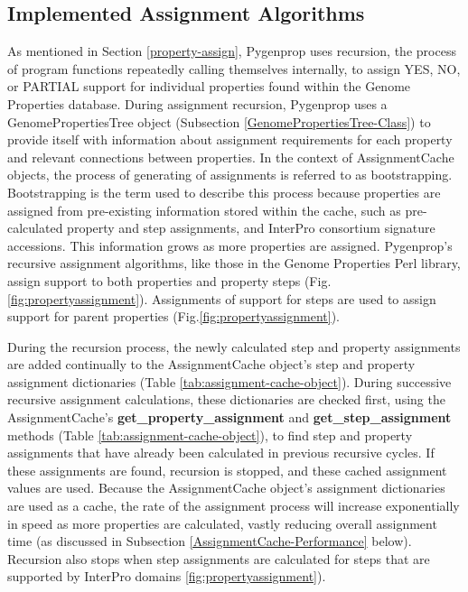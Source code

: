 \subsection{Implemented Assignment Algorithms} 
\label{AssignmentCachingAlgorithm}

As mentioned in Section \ref{property-assign}, Pygenprop uses recursion, the 
process of program functions repeatedly calling themselves internally, to assign 
YES, NO, or PARTIAL support for individual properties found within the Genome 
Properties database. During assignment recursion, Pygenprop uses a 
GenomePropertiesTree object (Subsection \ref{GenomePropertiesTree-Class}) to 
provide itself with information about assignment requirements for each property 
and relevant connections between properties. In the context of AssignmentCache 
objects, the process of generating of assignments is referred to as 
bootstrapping. Bootstrapping is the term used to describe this process because 
properties are assigned from pre-existing information stored within the cache, 
such as pre-calculated property and step assignments, and InterPro consortium 
signature accessions. This information grows as more properties are assigned. 
Pygenprop's recursive assignment algorithms, like those in the Genome Properties 
Perl library, assign support to both properties and property steps (Fig. 
\ref{fig:propertyassignment}). Assignments of support for steps are used to 
assign support for parent properties (Fig.\ref{fig:propertyassignment}).

During the recursion process, the newly calculated step and property assignments 
are added continually to the AssignmentCache object's step and property 
assignment dictionaries (Table \ref{tab:assignment-cache-object}). During 
successive recursive assignment calculations, these dictionaries are checked 
first, using the AssignmentCache's \textbf{get\_property\_assignment} and 
\textbf{get\_step\_assignment} methods (Table 
\ref{tab:assignment-cache-object}), to find step and property assignments that 
have already been calculated in previous recursive cycles. If these assignments 
are found, recursion is stopped, and these cached assignment values are used. 
Because the AssignmentCache object's assignment dictionaries are used as a 
cache, the rate of the assignment process will increase exponentially in speed 
as more properties are calculated, vastly reducing overall assignment time (as 
discussed in Subsection \ref{AssignmentCache-Performance} below). Recursion also 
stops when step assignments are calculated for steps that are supported by 
InterPro domains \ref{fig:propertyassignment}).

